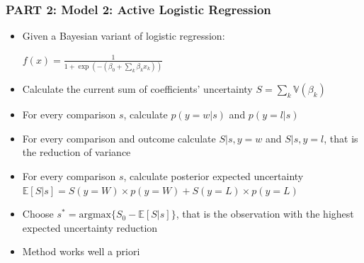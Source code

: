 \documentclass{beamer}
\begin{document}
\begin{frame}
 \frametitle{PART 2: Model 2: Active Logistic Regression}
\begin{itemize}
\item Given a Bayesian variant of logistic regression:
\begin{center}
$f(x)=\frac{1}{1+\exp(-(\beta_0+\sum_k \beta_k x_k))}$
\end{center}
\item Calculate the current sum of coefficients' uncertainty
$S=\sum_k \mathbb{V}(\beta_k)$
\item For every comparison $s$, calculate $p(y=w|s)$ and $p(y=l|s)$
\item For every comparison and outcome calculate $S|s,y=w$ and $S|s,y=l$, that is the reduction of variance
\item For every comparison $s$, calculate posterior expected uncertainty
$ \mathbb{E}[S|s]=S(y=W) \times p(y=W)+S(y=L) \times p(y=L)$
\item Choose $s^*=\text{argmax} \{S_0-\mathbb{E}[S|s]\}$, that is the observation with the highest expected uncertainty reduction
\item Method works well a priori
\end{itemize}
\end{frame}
\end{document}
